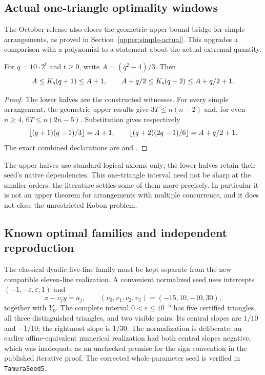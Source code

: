 \subsection{Actual one-triangle optimality windows}

The October release also closes the geometric upper-bound bridge for
simple arrangements, as proved in Section~\ref{upper:simple-actual}.
This upgrades a comparison with a polynomial to a statement about the
actual extremal quantity.

\begin{corollary}\label{fam:optimality-windows}
For $q=10\cdot2^t$ and $t\ge0$, write $A=(q^2-4)/3$. Then
\begin{equation}
 A\le K_{\mathrm{s}}(q+1)\le A+1,\qquad
 A+q/2\le K_{\mathrm{s}}(q+2)\le A+q/2+1.
 \label{fam:windows}
\end{equation}
\end{corollary}
\begin{proof}
The lower halves are the constructed witnesses. For every simple
arrangement, the geometric upper results give
$3T\le n(n-2)$ and, for even $n\ge4$, $6T\le n(2n-5)$.
Substitution gives respectively
\[
 \left\lfloor(q+1)(q-1)/3\right\rfloor=A+1,
 \qquad \left\lfloor(q+2)(2q-1)/6\right\rfloor=A+q/2+1.
\]
The exact combined declarations are
 and
.
\end{proof}

The upper halves use standard logical axioms only; the lower halves
retain their seed's native dependencies. This one-triangle interval
need not be sharp at the smaller orders: the literature settles some
of them more precisely. In particular it is not an upper theorem for
arrangements with multiple concurrence, and it does not close the
unrestricted Kobon problem.

\subsection{Known optimal families and independent reproduction}

The classical dyadic five-line family must be kept separate from the
new compatible eleven-line realization.  A convenient normalized seed
uses intercepts $(-1,-\varepsilon,\varepsilon,1)$ and
\[
 x-v_jy=a_j,\qquad (v_0,v_1,v_2,v_3)=(-15,10,-10,30),
\]
together with $Y_0$.  The complete interval
$0<\varepsilon\leq10^{-5}$ has five certified triangles, all three
distinguished triangles, and two visible pairs.  Its central slopes
are $1/10$ and $-1/10$; the rightmost slope is $1/30$.
The normalization is deliberate: an earlier affine-equivalent numerical
realization had both central slopes negative, which was inadequate as
an unchecked premise for the sign convention in the published iterative
proof.  The corrected whole-parameter seed is verified in
\texttt{TamuraSeed5}.

